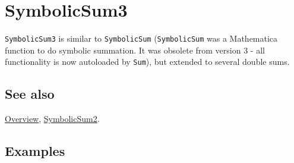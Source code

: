 \documentclass[../FeynCalcManual.tex]{subfiles}
\begin{document}
\hypertarget{symbolicsum3}{
\section{SymbolicSum3}\label{symbolicsum3}}

\texttt{SymbolicSum3} is similar to \texttt{SymbolicSum}
(\texttt{SymbolicSum} was a Mathematica function to do symbolic
summation. It was obsolete from version 3 - all functionality is now
autoloaded by \texttt{Sum}), but extended to several double sums.

\subsection{See also}

\hyperlink{toc}{Overview}, \hyperlink{symbolicsum2}{SymbolicSum2}.

\subsection{Examples}
\end{document}
